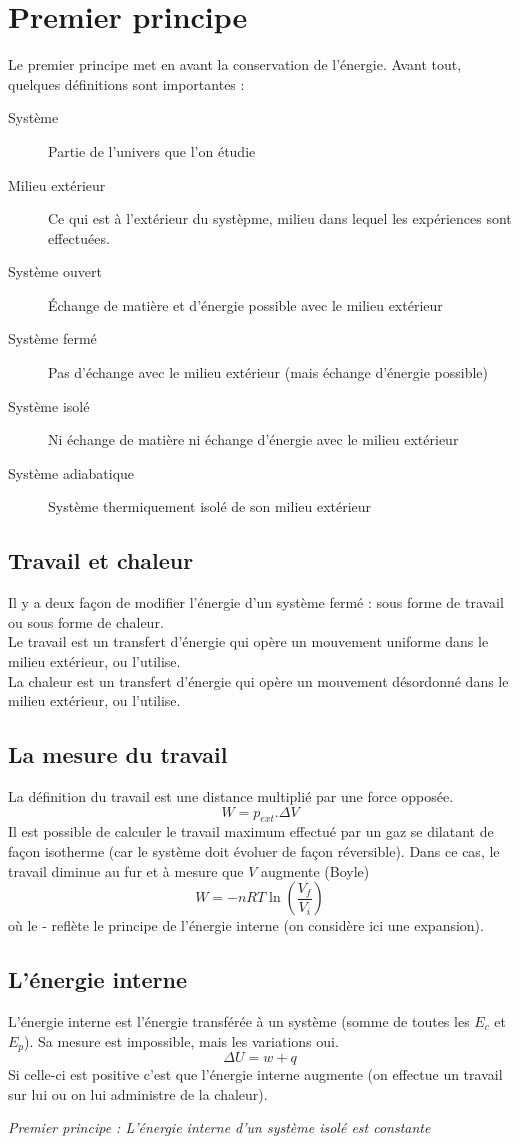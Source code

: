 \documentclass[british,french,11pt, a4paper, openany]{book}
\begin{document}
\section{Premier principe}
Le premier principe met en avant la conservation de l'énergie. Avant tout, quelques définitions sont importantes : 
\begin{description}
	\item[Système] Partie de l'univers que l'on étudie
	\item[Milieu extérieur] Ce qui est à l'extérieur du systèpme, milieu dans lequel les expériences sont effectuées.
	\item[Système ouvert] Échange de matière et d'énergie possible avec le milieu extérieur
	\item[Système fermé] Pas d'échange avec le milieu extérieur (mais échange d'énergie possible)
	\item[Système isolé] Ni échange de matière ni échange d'énergie avec le milieu extérieur
	\item[Système adiabatique] Système thermiquement isolé de son milieu extérieur
\end{description}
\subsection{Travail et chaleur}
Il y a deux façon de modifier l'énergie d'un système fermé : sous forme de travail ou sous forme de chaleur.\\
Le travail est un transfert d'énergie qui opère un mouvement uniforme dans le milieu extérieur, ou l'utilise.\\
La chaleur est un transfert d'énergie qui opère un mouvement désordonné dans le milieu extérieur, ou l'utilise.

\subsection{La mesure du travail}
La définition du travail est une distance multiplié par une force opposée.
$$W = p_{ext}.\Delta V$$
Il est possible de calculer le travail maximum effectué par un gaz se dilatant de façon isotherme (car le système doit évoluer de façon réversible). Dans ce cas, le travail diminue au fur et à mesure que $V$ augmente (Boyle)
$$W = -nRT\ln\left(\frac{V_f}{V_i}\right)$$
où le - reflète le principe de l'énergie interne (on considère ici une expansion).

\subsection{L'énergie interne}
L'énergie interne est l'énergie transférée à un système (somme de toutes les $E_c$ et $E_p$). Sa mesure est impossible, mais les variations oui.
$$\Delta U = w + q$$
Si celle-ci est positive c'est que l'énergie interne augmente (on effectue un travail sur lui ou on lui administre de la chaleur).
\begin{center}
	\textit{Premier principe : L'énergie interne d'un système isolé est constante}
\end{center}
\end{document}
